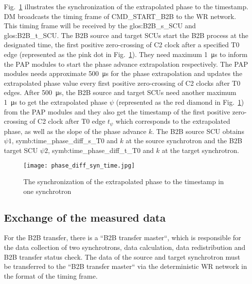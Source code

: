 Fig.~\ref{phase_diff_syn_time} illustrates the synchronization of the extrapolated phase to the timestamp. DM broadcasts the timing frame of CMD\_START\_B2B to the WR network. This timing frame will be received by the \gls{glos:B2B_s_SCU} and \gls{glos:B2B_t_SCU}. The B2B source and target SCUs start the B2B process at the designated time, the first positive zero-crossing of C2 clock after a specified T0 edge (represented as the pink dot in Fig.~\ref{phase_diff_syn_time}). They need maximum \SI{1}{\us} to inform the PAP modules to start the phase advance extrapolation respectively. The PAP modules needs approximate \SI{500}{\us} for the phase extrapolation and updates the extrapolated phase value every first positive zero-crossing of C2 clocks after T0 edges. After \SI{500}{\us}, the B2B source and target SCUs need another maximum \SI{1}{\us} to get the extrapolated phase $\psi$ (represented as the red diamond in Fig.~\ref{phase_diff_syn_time}) from the PAP modules and they also get the timestamp of the first positive zero-crossing of C2 clock after T0 edge $t_{\psi}$ which corresponds to the extrapolated phase, as well as the slope of the phase advance $k$. The B2B source SCU obtains $\psi1$, \gls{symb:time_phase_diff_s_T0} and $k$ at the source synchrotron and the B2B target SCU $\psi2$, \gls{symb:time_phase_diff_t_T0} and $k$ at the target synchrotron.
 \begin{figure}[!htb]
   \centering   
   \texttt{[image: phase\_diff\_syn\_time.jpg]}
   \caption{The synchronization of the extrapolated phase to the timestamp in one synchrotron}
   \label{phase_diff_syn_time}
\end{figure}
\subsection{Exchange of the measured data}

For the B2B transfer, there is a ``B2B transfer master``, which is responsible for the data collection of two synchrotrons, data calculation, data redistribution and B2B transfer status check. The data of the source and target synchrotron must be transferred to the ``B2B transfer master`` via the deterministic WR network in the format of the timing frame.
 
